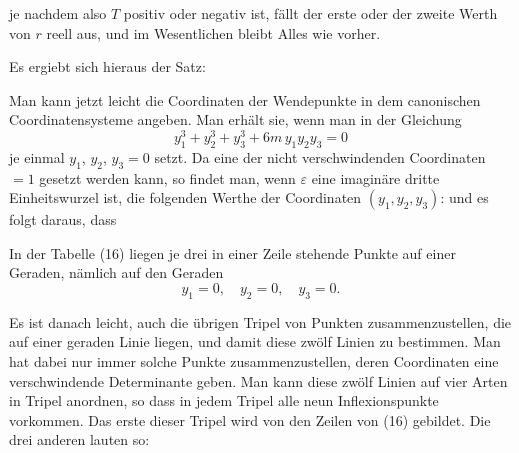 je nachdem also $T$ positiv oder negativ ist, fällt der erste oder
der zweite Werth von $r$ reell aus, und im Wesentlichen bleibt
Alles wie vorher.

Es ergiebt sich hieraus der Satz:


Man kann jetzt leicht die Coordinaten der Wendepunkte in
dem canonischen Coordinatensysteme angeben. Man erhält sie,
wenn man in der Gleichung
\[
y_1^3+y_2^3+y_3^3+6m\,y_1y_2y_3=0
\]
je einmal $y_1$, $y_2$, $y_3=0$ setzt. Da eine der nicht verschwindenden
Coordinaten $=1$ gesetzt werden kann, so findet man, wenn $\varepsilon$
eine imaginäre dritte Einheitswurzel ist, die folgenden Werthe
der Coordinaten $(y_1, y_2, y_3)$:
und es folgt daraus, dass 

In der Tabelle (16) liegen je drei in einer Zeile stehende
Punkte auf einer Geraden, nämlich auf den Geraden
\[
y_1=0, \quad y_2=0, \quad y_3=0.
\]

Es ist danach leicht, auch die übrigen Tripel von Punkten
zusammenzustellen, die auf einer geraden Linie liegen, und damit
diese zwölf Linien zu bestimmen. Man hat dabei nur immer
solche Punkte zusammenzustellen, deren Coordinaten eine verschwindende
 Determinante geben. Man kann diese zwölf Linien
auf vier Arten in Tripel anordnen, so dass in jedem Tripel alle
neun Inflexionspunkte vorkommen. Das erste dieser Tripel wird
von den Zeilen von (16) gebildet. Die drei anderen lauten so:
